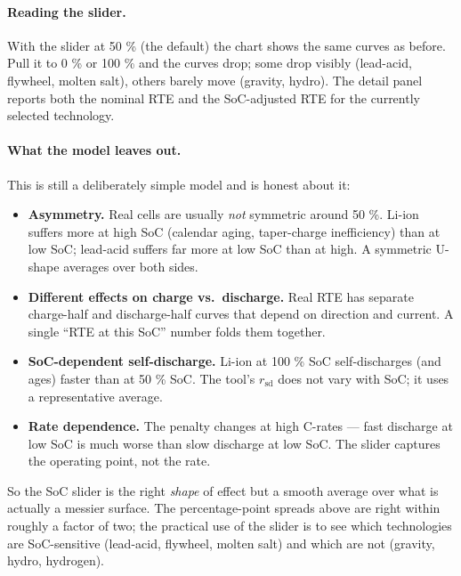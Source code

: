 \paragraph{Reading the slider.}
With the slider at 50 \% (the default) the chart shows the same
curves as before. Pull it to 0 \% or 100 \% and the curves drop;
some drop visibly (lead-acid, flywheel, molten salt), others barely
move (gravity, hydro). The detail panel reports both the nominal RTE
and the SoC-adjusted RTE for the currently selected technology.

\paragraph{What the model leaves out.}
This is still a deliberately simple model and is honest about it:

\begin{itemize}
    \item \textbf{Asymmetry.} Real cells are usually \emph{not}
    symmetric around 50 \%. Li-ion suffers more at high SoC (calendar
    aging, taper-charge inefficiency) than at low SoC; lead-acid
    suffers far more at low SoC than at high. A symmetric U-shape
    averages over both sides.
    \item \textbf{Different effects on charge vs.\ discharge.}
    Real RTE has separate charge-half and discharge-half curves
    that depend on direction and current. A single ``RTE at this
    SoC'' number folds them together.
    \item \textbf{SoC-dependent self-discharge.} Li-ion at 100 \%
    SoC self-discharges (and ages) faster than at 50 \% SoC. The
    tool's $r_{\mathrm{sd}}$ does not vary with SoC; it uses a
    representative average.
    \item \textbf{Rate dependence.} The penalty changes at high
    C-rates --- fast discharge at low SoC is much worse than slow
    discharge at low SoC. The slider captures the operating point,
    not the rate.
\end{itemize}

So the SoC slider is the right \emph{shape} of effect but a smooth
average over what is actually a messier surface. The
percentage-point spreads above are right within roughly a factor
of two; the practical use of the slider is to see which
technologies are SoC-sensitive (lead-acid, flywheel, molten salt)
and which are not (gravity, hydro, hydrogen).
